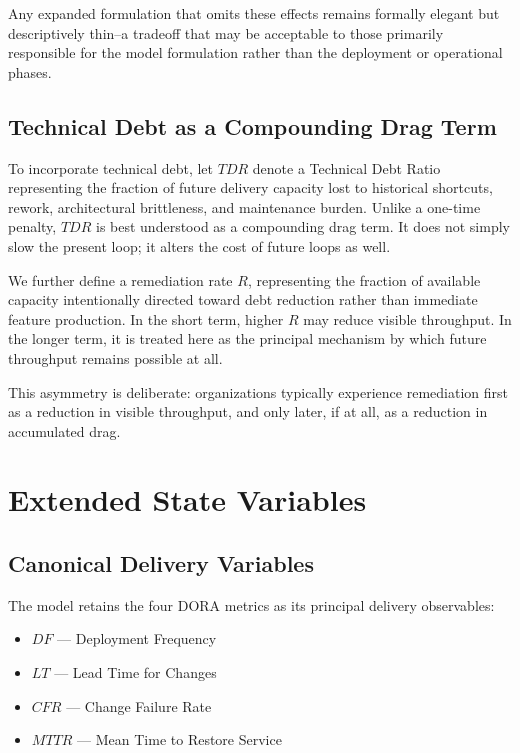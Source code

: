 \documentclass[letterpaper]{article}
\begin{document}
Any expanded formulation that omits these effects remains formally elegant but descriptively thin--a tradeoff that may be acceptable to those primarily responsible for the model formulation rather than the deployment or operational phases. \cite{scottvr2026devopsgum}


\subsection{Technical Debt as a Compounding Drag Term}

To incorporate technical debt, let $TDR$ denote a Technical Debt Ratio representing the fraction of future delivery capacity lost to historical shortcuts, rework, architectural brittleness, and maintenance burden. Unlike a one-time penalty, $TDR$ is best understood as a compounding drag term. It does not simply slow the present loop; it alters the cost of future loops as well.

We further define a remediation rate $R$, representing the fraction of available capacity intentionally directed toward debt reduction rather than immediate feature production. In the short term, higher $R$ may reduce visible throughput. In the longer term, it is treated here as the principal mechanism by which future throughput remains possible at all.

This asymmetry is deliberate: organizations typically experience remediation first as a reduction in visible throughput, and only later, if at all, as a reduction in accumulated drag.

\section{Extended State Variables}

\subsection{Canonical Delivery Variables}

The model retains the four DORA metrics as its principal delivery observables:
\begin{itemize}
    \item \textbf{$DF$} --- Deployment Frequency
    \item \textbf{$LT$} --- Lead Time for Changes
    \item \textbf{$CFR$} --- Change Failure Rate
    \item \textbf{$MTTR$} --- Mean Time to Restore Service
\end{itemize}
\end{document}
